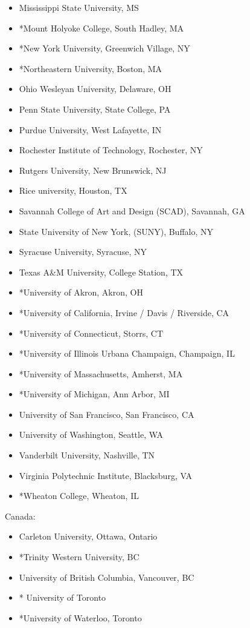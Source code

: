\begin{itemize}
\item Mississippi State University, MS
\item *Mount Holyoke College, South Hadley, MA
\item *New York University, Greenwich Village, NY
\item *Northeastern University, Boston, MA
\item Ohio Wesleyan University, Delaware, OH
\item Penn State University, State College, PA
\item Purdue University, West Lafayette, IN
\item Rochester Institute of Technology, Rochester, NY
\item Rutgers University, New Brunswick, NJ
\item Rice university, Houston, TX
\item Savannah College of Art and Design (SCAD), Savannah, GA
\item State University of New York, (SUNY), Buffalo, NY
\item Syracuse University, Syracuse, NY
\item Texas A\&M University, College Station, TX
\item *University of Akron, Akron, OH
\item *University of California, Irvine / Davis / Riverside, CA
\item *University of Connecticut, Storrs, CT
\item *University of Illinois Urbana Champaign, Champaign, IL
\item *University of Massachusetts, Amherst, MA
\item *University of Michigan, Ann Arbor, MI
\item University of San Francisco, San Francisco, CA
\item University of Washington, Seattle, WA
\item Vanderbilt University, Nashville, TN
\item Virginia Polytechnic Institute, Blacksburg, VA
\item *Wheaton College, Wheaton, IL
\end{itemize}


Canada:

\begin{itemize}
\item Carleton University, Ottawa, Ontario
\item *Trinity Western University, BC
\item University of British Columbia, Vancouver, BC
\item * University of Toronto
\item *University of Waterloo, Toronto
\end{itemize}



